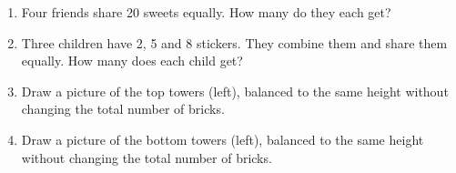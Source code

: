\documentclass{beamer}
\newcommand{\ashow}[1]{\uncover<2->{\textcolor{red}{\small #1}}}
\newcommand{\ashowq}[1]{\alt<2->{\textcolor{red}{\small #1}}{?}}
\begin{document}
\begin{frame}
\begin{columns}[T]
\footnotesize
\vspace{0.2em}
\begin{enumerate}\itemsep1pt
  \item Four friends share 20 sweets equally. How many do they each get? \ashow{5 sweets}
  \item Three children have 2, 5 and 8 stickers. They combine them and share them equally. How many does each child get? \ashow{5 stickers}
  \item Draw a picture of the top towers (left), balanced to the same height without changing the total number of bricks.
  \item Draw a picture of the bottom towers (left), balanced to the same height without changing the total number of bricks.
\end{enumerate}

\end{columns}
\end{frame}
\end{document}
